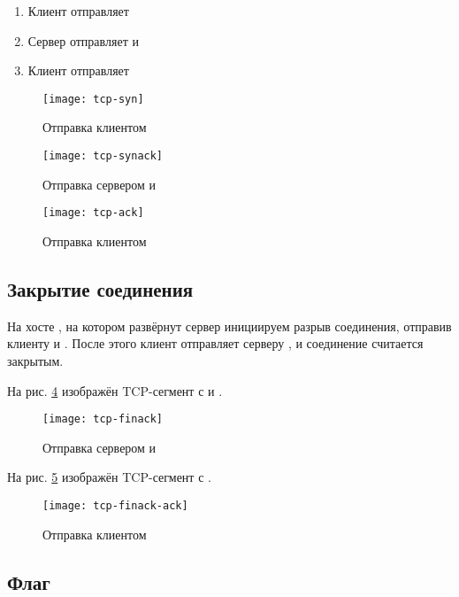 \begin{enumerate}
	\item Клиент отправляет 
	\item Сервер отправляет  и 
	\item Клиент отправляет 
\end{enumerate}

\begin{figure}[H]
	\centering
	\texttt{[image: tcp-syn]}
	\caption{Отправка клиентом }
	\label{fig:tcp-syn}
\end{figure}

\begin{figure}[H]
	\centering
	\texttt{[image: tcp-synack]}
	\caption{Отправка сервером  и }
	\label{fig:tcp-synack}
\end{figure}

\begin{figure}[H]
	\centering
	\texttt{[image: tcp-ack]}
	\caption{Отправка клиентом }
	\label{fig:tcp-ack}
\end{figure}

\subsection{Закрытие соединения}

На хосте , на котором развёрнут сервер инициируем разрыв соединения, отправив клиенту  и . После этого клиент отправляет серверу , и соединение считается закрытым.

На рис. \ref{fig:tcp-finack} изображён TCP-сегмент с  и .

\begin{figure}[H]
	\centering
	\texttt{[image: tcp-finack]}
	\caption{Отправка сервером  и }
	\label{fig:tcp-finack}
\end{figure}

На рис. \ref{fig:tcp-finack-ack} изображён TCP-сегмент с .

\begin{figure}[H]
	\centering
	\texttt{[image: tcp-finack-ack]}
	\caption{Отправка клиентом }
	\label{fig:tcp-finack-ack}
\end{figure}

\subsection{Флаг }

